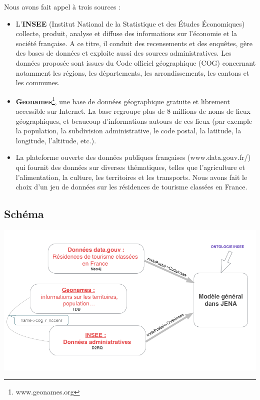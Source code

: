 \documentclass{article}
\begin{document}
Nous avons fait appel à trois sources  :
\begin{itemize}
	\item L'\textbf{INSEE} (Institut National de la Statistique et des Études Économiques) collecte, produit, analyse et diffuse des informations sur l'économie et la société française.
	A ce titre, il conduit des recensements et des enquêtes, gère des bases de données et exploite aussi des sources administratives.
	Les données proposée sont issues du Code officiel géographique (COG) concernant notamment les régions, les départements, les arrondissements, les cantons et les communes.
	\item \textbf{Geonames}\footnote{www.geonames.org}, une base de données géographique gratuite et librement accessible sur Internet.
	La base regroupe plus de 8 millions de noms de lieux géographiques, et beaucoup d’informations autours de ces lieux (par exemple la  population, la subdivision administrative, le code postal, la latitude, la longitude, l'altitude, etc.). 
	\item La plateforme ouverte des données publiques françaises (www.data.gouv.fr/) qui fournit des données sur diverses thématiques, telles que l'agriculture et l'alimentation, la culture, les territoires et les transports.
	Nous avons fait le choix d'un jeu de données sur les résidences de tourisme classées en France.
\end{itemize}

\subsection{Schéma}


\begin{center}
	\includegraphics[scale=0.5]{interconnexion.png} 
	\label{fig_interconnexion}
\end{center}
\end{document}
